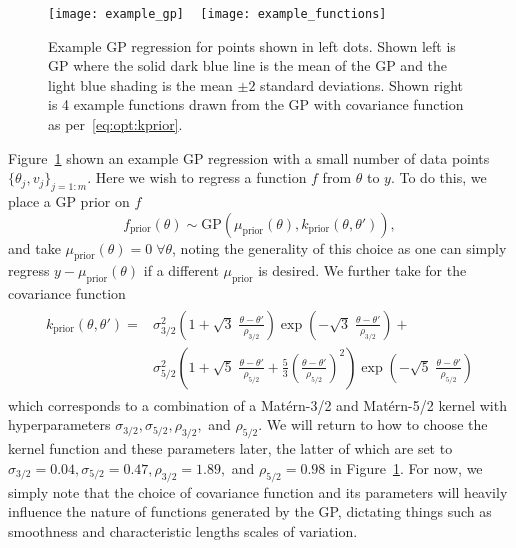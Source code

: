 \begin{figure}[t]
	\texttt{[image: example\_gp]}
		~
	\texttt{[image: example\_functions]}
	\caption{Example GP regression for points shown in left dots.  Shown left is GP where
		the solid dark blue line is the mean of the GP and the light blue shading is the
		mean $\pm2$ standard deviations.  Shown right is 4 example functions drawn
		from the GP with covariance function as per~\eqref{eq:opt:kprior}.\label{fig:opt:example_gp}}
\end{figure}

Figure~\ref{fig:opt:example_gp} shown an example GP regression with a small
number of data points $\{\theta_j,{v}_j\}_{j=1:m}$.  Here we wish to regress a function $f$ 
from $\theta$ to $y$.  To do this, we place a GP prior on $f$
\[
f_{\text{prior}} (\theta) \sim \text{GP}\left(\mu_{\text{prior}} (\theta),k_{\text{prior}}(\theta,\theta')\right),
\]
and take $\mu_{\text{prior}} (\theta) = 0 \; \forall \theta$, noting the
generality of this choice as one can simply regress $y-\mu_{\text{prior}}(\theta)$ if
a different $\mu_{\text{prior}}$ is desired.  We further take for the covariance function
\begin{align}
\label{eq:opt:kprior}
\begin{split}
k_{\text{prior}}\left(\theta,\theta'\right) = & \sigma_{3/2}^2 \left(1+\sqrt{3} \; \frac{\theta-\theta'}{\rho_{3/2}}\right)\exp\left(-\sqrt{3} \;\frac{\theta-\theta'}{\rho_{3/2}}\right) +\\&\sigma_{5/2}^2 \left(1+\sqrt{5}\;\frac{\theta-\theta'}{\rho_{5/2}}+\frac{5}{3}\left(\frac{\theta-\theta'}{\rho_{5/2}}\right)^2\right)\exp\left(-\sqrt{5}\;\frac{\theta-\theta'}{\rho_{5/2}}\right)
\end{split}
\end{align}
which corresponds to a combination of a Mat\'{e}rn-3/2 and Mat\'{e}rn-5/2
kernel with hyperparameters $\sigma_{3/2}, \sigma_{5/2}, \rho_{3/2},$ and
$\rho_{5/2}$.  We will return to how to choose the kernel function and
these parameters later, the latter of which are set to
$\sigma_{3/2}=0.04, \sigma_{5/2}=0.47, \rho_{3/2}=1.89,$ and
$\rho_{5/2}=0.98$ in Figure~\ref{fig:opt:example_gp}.  For now, we simply note
that the choice of covariance function and its parameters will heavily influence 
the nature of functions generated by the GP, dictating things such as smoothness 
and characteristic lengths scales of variation.


